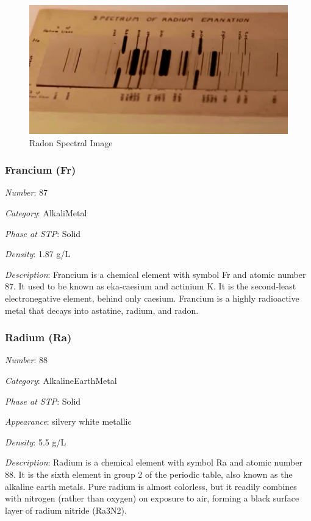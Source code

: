 \documentclass{article}
\begin{document}
\immediate{}
\begin{figure}[!ht]
    \centering
    \includegraphics[width=12cm]{./resources/spectral_img/Radon_spectrum.png}
    \caption{Radon Spectral Image}
\end{figure}

\hypertarget{subsubsection::Fr}{}\subsubsection{Francium (Fr)}

\textit{Number}: 87

\textit{Category}: AlkaliMetal

\textit{Phase at STP}: Solid

\textit{Density}: 1.87 g/L

\textit{Description}: Francium is a chemical element with symbol Fr and atomic number 87. It used to be known as eka-caesium and actinium K. It is the second-least electronegative element, behind only caesium. Francium is a highly radioactive metal that decays into astatine, radium, and radon.

\hypertarget{subsubsection::Ra}{}\subsubsection{Radium (Ra)}

\textit{Number}: 88

\textit{Category}: AlkalineEarthMetal

\textit{Phase at STP}: Solid

\textit{Appearance}: silvery white metallic

\textit{Density}: 5.5 g/L

\textit{Description}: Radium is a chemical element with symbol Ra and atomic number 88. It is the sixth element in group 2 of the periodic table, also known as the alkaline earth metals. Pure radium is almost colorless, but it readily combines with nitrogen (rather than oxygen) on exposure to air, forming a black surface layer of radium nitride (Ra3N2).
\end{document}
